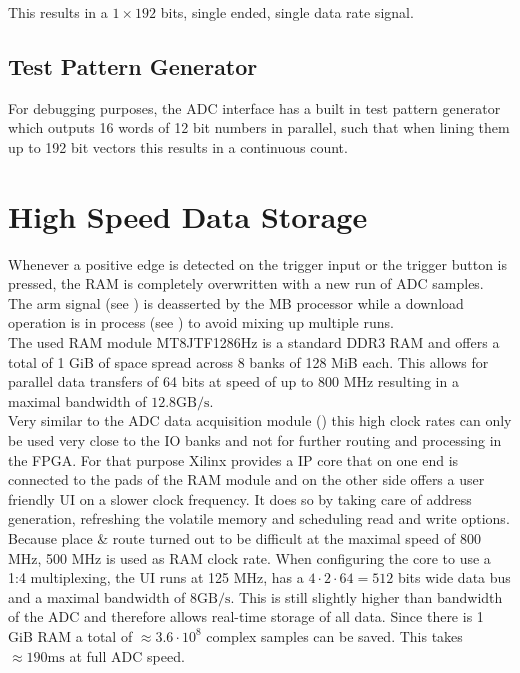 This results in a $1 \times 192$ bits, single ended, single data rate signal. \\

\subsection{Test Pattern Generator}
For debugging purposes, the \gls{ADC} interface has a built in test pattern
generator which outputs 16 words of 12 bit numbers in parallel, such that
when lining them up to 192 bit vectors this results in a continuous count.

\section{High Speed Data Storage}
\label{sec:fpga_storage}

Whenever a positive edge is detected on the trigger input or the trigger
button is pressed, the \gls{RAM} is completely overwritten with a new run of
\gls{ADC} samples. \\

The arm signal (see ) is deasserted
by the \gls{MB} processor while a download operation is in process
(see ) to avoid mixing up multiple runs. \\

The used \gls{RAM} module MT8JTF1286Hz is a standard \acrshort{DDR}3 \gls{RAM}
and offers a total of 1 GiB of space spread across 8 banks of 128 MiB each.
This allows for parallel data transfers of 64 bits at speed of up to 800 MHz
resulting in a maximal bandwidth of $12.8 \text{GB}/\text{s}$. \\

Very similar to the \gls{ADC} data acquisition module ()
this high clock rates can only be used very close to the \gls{IO} banks
and not for further routing and processing in the \gls{FPGA}.
For that purpose Xilinx provides a \gls{IP} core that on one end is connected
to the pads of the \gls{RAM} module and on the other side offers a user
friendly \gls{UI} on a slower clock frequency.
It does so by taking care of address generation, refreshing the volatile
memory and scheduling read and write options. \\

Because place \& route turned out to be difficult at the maximal speed
of 800 MHz, 500 MHz is used as \gls{RAM} clock rate.
When configuring the core to use a 1:4 multiplexing, the \gls{UI} runs
at 125 MHz, has a $4 \cdot 2 \cdot 64 = 512$ bits wide data bus
and a maximal bandwidth of $8 \text{GB}/\text{s}$. This is still slightly
higher than bandwidth of the \gls{ADC} and therefore allows real-time
storage of all data. Since there is 1 GiB \gls{RAM}
a total of $\approx 3.6 \cdot 10^8$ complex samples can be saved. This
takes $\approx 190 \text{ms}$ at full \gls{ADC} speed. \\


